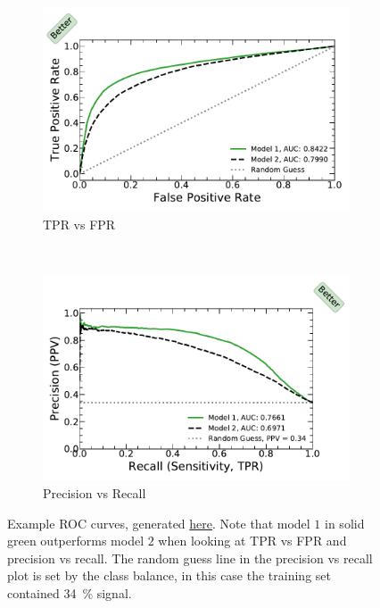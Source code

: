 \begin{figure}[H]
\centering
  \begin{subfigure}[c]{0.48\textwidth}\centering
  \includegraphics[width=\textwidth,trim={0.18cm 0.3cm 0.18cm 0.3cm},clip]{figures/ml/roc_curves/roc}%
  \caption{TPR vs FPR}
  \label{fig:ml:roc:standard}
  \end{subfigure}
  ~
  \begin{subfigure}[c]{0.48\textwidth}\centering
  \includegraphics[width=\textwidth,trim={0.18cm 0.3cm 0.18cm 0.3cm},clip]{figures/ml/roc_curves/roc_precision_recall}%
  \caption{Precision vs Recall}
  \label{fig:ml:roc:precision_recall}
  \end{subfigure}
\caption{
Example ROC curves, generated \href{https://github.com/mepland/data_science_notes/blob/main/plots/plots.ipynb}{here}.
Note that model $1$ in solid green outperforms model $2$ when looking at TPR vs FPR and precision vs recall.
The random guess line in the precision vs recall plot is set by the class balance,
in this case the training set contained \SI{34}{\percent} signal.
}
\label{fig:ml:roc}
\end{figure}

